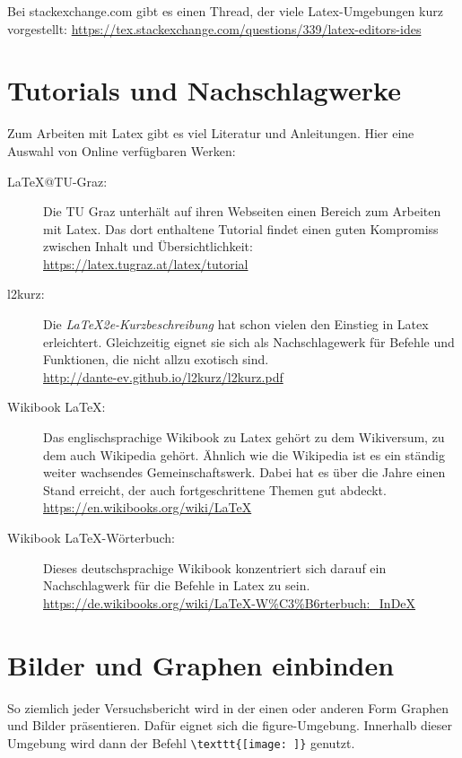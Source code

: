 \documentclass[ngerman]{scrartcl}
\begin{document}
Bei stackexchange.com gibt es einen Thread, der viele Latex-Umgebungen kurz vorgestellt:
\url{https://tex.stackexchange.com/questions/339/latex-editors-ides}

\section{Tutorials und Nachschlagwerke}
Zum Arbeiten mit Latex gibt es viel Literatur und Anleitungen. Hier eine Auswahl von Online verfügbaren Werken:
\begin{description}
	\item [LaTeX@TU-Graz:] Die TU Graz unterhält auf ihren Webseiten einen Bereich zum Arbeiten mit Latex. Das dort enthaltene Tutorial findet einen guten Kompromiss zwischen Inhalt und Übersichtlichkeit: \\
		\url{https://latex.tugraz.at/latex/tutorial}
	\item [l2kurz:] Die \textit{\LaTeX2e-Kurzbeschreibung} hat schon vielen den Einstieg in Latex erleichtert. Gleichzeitig eignet sie sich als Nachschlagewerk für Befehle und Funktionen, die nicht allzu exotisch sind. \\
		\url{http://dante-ev.github.io/l2kurz/l2kurz.pdf}
	\item [Wikibook LaTeX:] Das englischsprachige Wikibook zu Latex gehört zu dem Wikiversum, zu dem auch Wikipedia gehört. Ähnlich wie die Wikipedia ist es ein ständig weiter wachsendes Gemeinschaftswerk. Dabei hat es über die Jahre einen Stand erreicht, der auch fortgeschrittene Themen gut abdeckt. \\
		\url{https://en.wikibooks.org/wiki/LaTeX}
	\item [Wikibook LaTeX-Wörterbuch:] Dieses deutschsprachige Wikibook konzentriert sich darauf ein Nachschlagwerk für die Befehle in Latex zu sein. \\
		\url{https://de.wikibooks.org/wiki/LaTeX-W%C3%B6rterbuch:_InDeX}
\end{description}

\section{Bilder und Graphen einbinden}
So ziemlich jeder Versuchsbericht wird in der einen oder anderen Form Graphen und Bilder präsentieren. Dafür eignet sich die figure-Umgebung. Innerhalb dieser Umgebung wird dann der Befehl \verb|\texttt{[image: ]}| genutzt.
\end{document}
